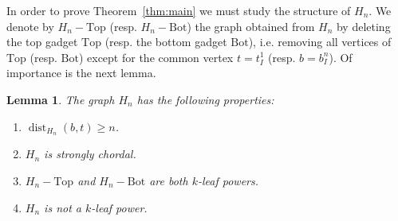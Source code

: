 \documentclass[11pt,letter]{article}
\newtheorem{lemma}[theorem]{Lemma}
\theoremstyle{remark}
\newcommand{\T}{\text{Top}}
\newcommand{\B}{\text{Bot}}
\DeclareMathOperator{\dist}{dist}
\begin{document}
In order to prove Theorem~\ref{thm:main} we must study the structure of $H_n$. We denote by $H_n - \T$ (resp. $H_n - \B$) the graph obtained from $H_n$ by deleting the top gadget $\T$ (resp. the bottom gadget $\B$), i.e. removing all vertices of $\T$ (resp. $\B$) except for the common vertex $t = t_I^1$ (resp. $b = b_I^n$). Of importance is the next lemma.
\begin{lemma}\label{lem:Hn}
    The graph $H_n$ has the following properties:
    \begin{enumerate}
        \item $\dist_{H_n}(b,t) \geq n$. \label{cond:increasing}
        \item $H_n$ is strongly chordal. \label{cond:Str-Chordal}
        \item $H_n - \T$ and $H_n - \B$ are both $k$-leaf powers. \label{cond:Top/Bot}
        \item $H_n$ is not a $k$-leaf power. \label{cond:not-LP}
        \end{enumerate}
\end{lemma}
\end{document}
